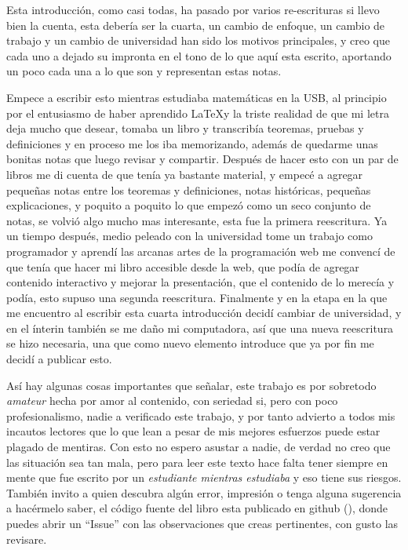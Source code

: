 \noindent Esta introducción, como casi todas, ha pasado por varios re-escrituras
si llevo bien la cuenta, esta debería ser la cuarta, un cambio de enfoque, 
un cambio de trabajo y un cambio de universidad han sido los motivos
principales, y creo que cada uno a dejado su impronta en el tono de lo que aquí
esta escrito, aportando un poco cada una a lo que son y representan estas notas.

Empece a escribir esto mientras estudiaba matemáticas en la USB, al principio
por el entusiasmo de haber aprendido \LaTeX y la triste realidad de que mi letra
deja mucho que desear, tomaba un libro y transcribía teoremas, pruebas y
definiciones y en proceso me los iba memorizando, además de quedarme unas
bonitas notas que luego revisar y compartir. Después de hacer esto con un par de
libros me di cuenta de que tenía ya bastante material, y empecé a agregar
pequeñas notas entre los teoremas y definiciones, notas históricas, pequeñas
explicaciones, y poquito a poquito lo que empezó como un seco conjunto de
notas, se volvió algo mucho mas interesante, esta fue la primera reescritura. Ya
un tiempo después, medio peleado con la universidad tome un trabajo como
programador y aprendí las arcanas artes de la programación web me convencí de
que tenía que hacer mi libro accesible desde la web, que podía de agregar
contenido interactivo y mejorar la presentación, que el contenido de lo merecía
y podía, esto supuso una segunda reescritura. Finalmente y en la etapa en la que
me encuentro al escribir esta cuarta introducción decidí cambiar de universidad,
y en el ínterin también se me daño mi computadora, así que una nueva reescritura
se hizo necesaria, una que como nuevo elemento introduce que ya por fin me
decidí a publicar esto.

Así hay algunas cosas importantes que señalar, este trabajo es por sobretodo
\emph{amateur} hecha por amor al contenido, con seriedad si, pero con poco
profesionalismo, nadie a verificado este trabajo, y por tanto advierto a todos
mis incautos lectores que lo que lean a pesar de mis mejores esfuerzos puede
estar plagado de mentiras. Con esto no espero asustar a nadie, de verdad no creo
que las situación sea tan mala, pero para leer este texto hace falta tener
siempre en mente que fue escrito por un \emph{estudiante mientras estudiaba} y
eso tiene sus riesgos. También invito a quien descubra algún error, impresión
o tenga alguna sugerencia a hacérmelo saber, el código fuente del libro esta
publicado en github (), donde puedes abrir un ``Issue''  con las observaciones
que creas pertinentes, con gusto las revisare.

